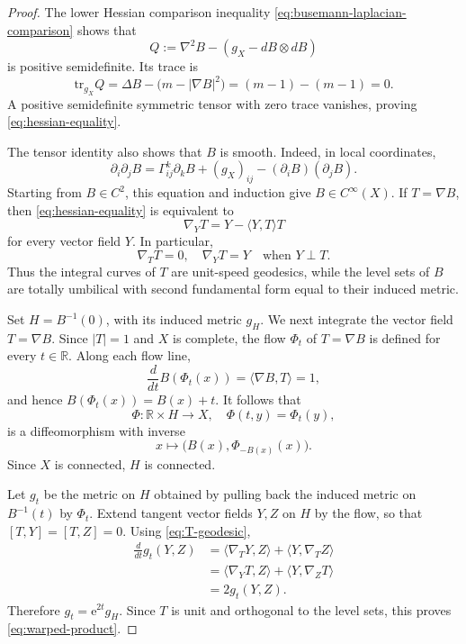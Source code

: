 \documentclass[12pt]{amsart}
\theoremstyle{definition}
\numberwithin{equation}{section}
\newcommand{\ee}{{\mathrm{e}}}
\newcommand{\R}{\mathbb{R}}
\newcommand{\tr}{\mathrm{tr}}
\begin{document}
\begin{proof}
The lower Hessian comparison inequality
\eqref{eq:busemann-laplacian-comparison} shows that
\[
  Q:=\nabla^2B-(g_X-dB\otimes dB)
\]
is positive semidefinite.  Its trace is
\[
  \tr_{g_X}Q
  =\Delta B-\bigl(m-|\nabla B|^2\bigr)
  =(m-1)-(m-1)=0.
\]
A positive semidefinite symmetric tensor with zero trace vanishes, proving
\eqref{eq:hessian-equality}.

The tensor identity also shows that \(B\) is smooth.  Indeed, in local
coordinates,
\[
  \partial_i\partial_jB
  =\Gamma_{ij}^{k}\partial_kB+(g_X)_{ij}
   -(\partial_iB)(\partial_jB).
\]
Starting from \(B\in C^2\), this equation and induction give
\(B\in C^\infty(X)\).  If \(T=\nabla B\), then
\eqref{eq:hessian-equality} is equivalent to
\begin{equation}\label{eq:nabla-T}
  \nabla_YT=Y-\langle Y,T\rangle T
\end{equation}
for every vector field \(Y\).  In particular,
\begin{equation}\label{eq:T-geodesic}
  \nabla_TT=0,
  \quad
  \nabla_YT=Y\quad\text{when }Y\perp T.
\end{equation}
Thus the integral curves of \(T\) are unit-speed geodesics, while the level
sets of \(B\) are totally umbilical with second fundamental form equal to
their induced metric.

Set \(H=B^{-1}(0)\), with its induced metric \(g_H\).  We next integrate
the vector field \(T=\nabla B\).
Since \(|T|=1\) and \(X\) is complete, the flow \(\Phi_t\) of
\(T=\nabla B\) is defined for every \(t\in\R\).  Along each flow line,
\begin{equation}\label{eq:B-along-flow}
  \frac{d}{dt}B(\Phi_t(x))
  =\langle\nabla B,T\rangle=1,
\end{equation}
and hence \(B(\Phi_t(x))=B(x)+t\).  It follows that
\[
  \Phi\colon\R\times H\longrightarrow X,
  \quad
  \Phi(t,y)=\Phi_t(y),
\]
is a diffeomorphism with inverse
\[
  x\longmapsto\bigl(B(x),\Phi_{-B(x)}(x)\bigr).
\]
Since \(X\) is connected, \(H\) is connected.

Let \(g_t\) be the metric on \(H\) obtained by pulling back the induced
metric on \(B^{-1}(t)\) by \(\Phi_t\).  Extend tangent vector fields
\(Y,Z\) on \(H\) by the flow, so that \([T,Y]=[T,Z]=0\).  Using
\eqref{eq:T-geodesic},
\begin{align*}
  \frac{d}{dt}g_t(Y,Z)
  &=\langle\nabla_TY,Z\rangle+\langle Y,\nabla_TZ\rangle \\
  &=\langle\nabla_YT,Z\rangle+\langle Y,\nabla_ZT\rangle \\
  &=2g_t(Y,Z).
\end{align*}
Therefore \(g_t=\ee^{2t}g_H\).  Since \(T\) is unit and orthogonal to the
level sets, this proves \eqref{eq:warped-product}.


\end{proof}
\end{document}

